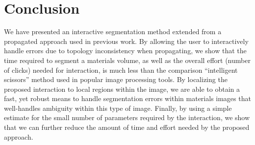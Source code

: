 \documentclass[]{spie}  %
\begin{document}
\section{Conclusion}
\label{sec:conclusion}

We have presented an interactive segmentation method extended from a
propagated approach used in previous work.  By allowing the user to
interactively handle errors due to topology inconsistency when
propagating, we show that the time required to segment a materials
volume, as well as the overall effort (number of clicks) needed for
interaction, is much less than the comparison ``intelligent
scissors'' method used in popular image processing tools.  By
localizing the proposed interaction to local regions within the image,
we are able to obtain a fast, yet robust means to handle segmentation
errors within materials images that well-handles ambiguity within this
type of image.  Finally, by using a simple estimate for the small
number of parameters required by the interaction, we show that we can
further reduce the amount of time and effort needed by the proposed
approach.


\end{document}
